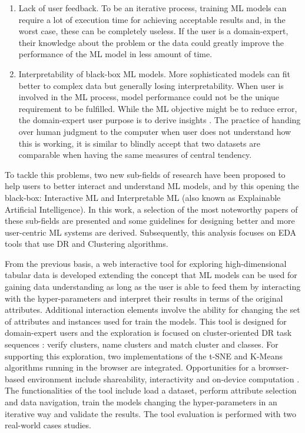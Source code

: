 \begin{enumerate}
\item Lack of user feedback. To be an iterative process, training ML models can require a lot of execution time for achieving acceptable results and, in the worst case, these can be completely useless. If the user is a domain-expert, their knowledge about the problem or the data could greatly improve the performance of the ML model in less amount of time.
\item Interpretability of black-box ML models. More sophisticated models can fit better to complex data but generally losing interpretability. When user is involved in the ML process, model performance could not be the unique requirement to be fulfilled. While the ML objective might be to reduce error, the domain-expert user purpose is to derive insights \cite{Lipton2017}. The practice of handing over human judgment to the computer when user does not understand how this is working, it is similar to blindly accept that two datasets are comparable when having the same measures of central tendency.
\end{enumerate}

To tackle this problems, two new sub-fields of research have been proposed to help users to better interact and understand ML models, and by this opening the black-box: Interactive ML and Interpretable ML (also known as Explainable Artificial Intelligence). In this work, a selection of the most noteworthy papers of these sub-fields are presented and some guidelines for designing better and more user-centric ML systems are derived. Subsequently, this analysis focuses on EDA tools that use DR and Clustering algorithms.

From the previous basis, a web interactive tool for exploring high-dimensional tabular data is developed extending the concept that ML models can be used for gaining data understanding as long as the user is able to feed them by interacting with the hyper-parameters and interpret their results in terms of the original attributes. Additional interaction elements involve the ability for changing the set of attributes and instances used for train the models. This tool is designed for domain-expert users and the exploration is focused on cluster-oriented DR task sequences \cite{Brehmer2014VisualizingSequences}: verify clusters, name clusters and match cluster and classes. For supporting this exploration, two implementations of the t-SNE \cite{VanDerMaaten2008} and K-Means \cite{Lloyd1982LeastPCM} algorithms running in the browser are integrated. Opportunities for a browser-based environment include shareability, interactivity and on-device computation \cite{Smilkov2019TensorFlow.js:Beyond}. The functionalities of the tool include load a dataset, perform attribute selection and data navigation, train the models changing the hyper-parameters in an iterative way and validate the results. The tool evaluation is performed with two real-world cases studies.

